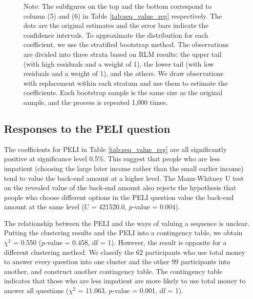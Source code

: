 \documentclass[
  12pt,
]{article}
\begin{document}
\begin{figure}
\vspace*{4pt}
\centering
\begin{minipage}{1.0\textwidth}
{\par\footnotesize Note: The subfigures on the top and the bottom correspond to column (5) and (6) in Table \ref{tab:seq_value_reg} respectively. The dots are the original estimates and the error bars indicate the confidence intervals. To approximate the distribution for each coefficient, we use the stratified bootstrap method. The observations are divided into three strata based on RLM results: the upper tail (with high residuals and a weight of 1), the lower tail (with low residuals and a weight of 1), and the others. We draw observations with replacement within each stratum and use them to estimate the coefficients. Each bootstrap sample is the same size as the original sample, and the process is repeated 1,000 times. }
\end{minipage}
\label{fig:bootstrap_ci}
\end{figure}

\hypertarget{responses-to-the-peli-question}{%
\subsection{Responses to the PELI
question}\label{responses-to-the-peli-question}}

The coefficients for PELI in Table \ref{tab:seq_value_reg} are all
significantly positive at significance level 0.5\%. This suggest that
people who are less impatient (choosing the large later income rather
than the small earlier income) tend to value the back-end amount at a
higher level. The Mann-Whitney U test on the revealed value of the
back-end amount also rejects the hypothesis that people who choose
different options in the PELI question value the back-end amount at the
same level (\(U\) = 421520.0, \(p\)-value = 0.004).

The relationship between the PELI and the ways of valuing a sequence is
unclear. Putting the clustering results and the PELI into a contingency
table, we obtain \(\chi^2\) = 0.550 (\(p\)-value = 0.458, df = 1).
However, the result is opposite for a different clustering method. We
classify the 62 participants who use total money to answer every
question into one cluster and the other 99 participants into another,
and construct another contingency table. The contingency table indicates
that those who are less impatient are more likely to use total money to
answer all questions (\(\chi^2\) = 11.063, \(p\)-value = 0.001, df = 1).
\end{document}
